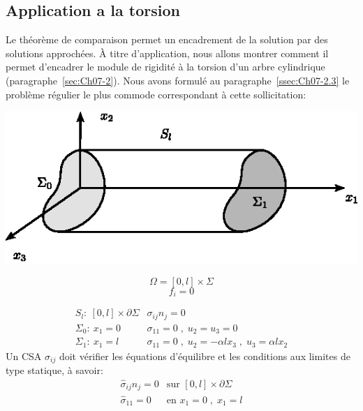 \subsection{Application a la torsion} \label{ssec:Ch09-1.4}
Le théorème de comparaison permet un encadrement de la solution par des solutions approchées.
À titre d'application, nous allons montrer comment il permet d'encadrer le module de rigidité à la torsion d'un arbre cylindrique (paragraphe~\ref{sec:Ch07-2}).
Nous avons formulé au paragraphe~\ref{ssec:Ch07-2.3} le problème régulier le plus commode correspondant à cette sollicitation: 
\begin{multicols}{2}
    \begin{center}
        \includegraphics{../images/T1_Ch09-01}
    \end{center}
    \columnbreak
    \[
        \Omega = [0,l]\times \Sigma
    \]
    \[
    f_i = 0
    \]
\end{multicols}
\begin{equation}
    \begin{aligned}
        S_l:\ [0,l] \times \partial \Sigma & \sigma_{ij} n_j = 0 \\
        \Sigma_0:\ x_1 = 0 & \sigma_{11} = 0 \;,\; u_2 = u_3 = 0 \\
        \Sigma_1:\ x_1 = l & \sigma_{11} = 0 \;,\; u_2 = -\alpha l x_3 \;,\; u_3 = \alpha l x_2
    \end{aligned}
    \label{eq:Ch09-033}
\end{equation}
Un CSA $\hat{\sigma}_{ij}$ doit vérifier les équations d'équilibre et les conditions aux limites de type statique, à savoir:
\begin{equation}
    \begin{aligned}
        \hat{\sigma}_{ij} n_j = 0 & \text{sur } [0,l] \times \partial \Sigma \\
        \hat{\sigma}_{11} = 0 & \text{en } x_1= 0 \;,\; x_1=l
    \end{aligned}
    \label{eq:Ch09-034}
\end{equation}
